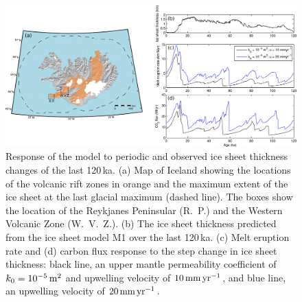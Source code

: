 \documentclass[draft,linenumbers]{agujournal2018}
\begin{document}
\begin{figure}
\includegraphics[width=14cm]{../figures/version05/figure2.png}
\caption{Response of the model to periodic and observed ice sheet thickness changes of the last 120\,ka. (a) Map of Iceland showing the locations of the volcanic rift zones in orange and the maximum extent of the ice sheet at the last glacial maximum (dashed line). The boxes show the location of the Reykjanes Peninsular (R.~P.) and the Western Volcanic Zone (W.~V.~Z.). (b) The ice sheet thickness predicted from the ice sheet model M1 over the last 120\,ka. (c) Melt eruption rate and (d) carbon flux response to the step change in ice sheet thickness: black line, an upper mantle permeability coefficient of $k_{0} = 10^{-5}\rm\,m^{2}$ and upwelling velocity of $10\rm\,mm\,yr^{-1}$, and blue line, an upwelling velocity of $20\rm\,mm\,yr^{-1}$.}
\label{fg:4}
\end{figure}
\end{document}
